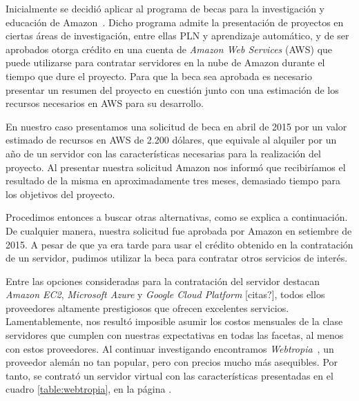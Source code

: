 Inicialmente se decidió aplicar al programa de becas para la investigación y educación de
Amazon~\cite{AmazonGrants}. Dicho programa admite la presentación de proyectos en ciertas áreas de
investigación, entre ellas PLN y aprendizaje automático, y de ser aprobados otorga crédito en una cuenta
de \textit{Amazon Web Services} (AWS) que puede utilizarse para contratar servidores en la nube de Amazon
durante el tiempo que dure el proyecto. Para que la beca sea aprobada es necesario presentar un resumen
del proyecto en cuestión junto con una estimación de los recursos necesarios en AWS para su desarrollo.

En nuestro caso presentamos una solicitud de beca en abril de 2015 por un valor estimado de recursos en
AWS de 2.200 dólares, que equivale al alquiler por un año de un servidor con las características
necesarias para la realización del proyecto. Al presentar nuestra solicitud Amazon nos informó que
recibiríamos el resultado de la misma en aproximadamente tres meses, demasiado tiempo para los objetivos
del proyecto.

Procedimos entonces a buscar otras alternativas, como se explica a continuación. De cualquier manera,
nuestra solicitud fue aprobada por Amazon en setiembre de 2015. A pesar de que ya era tarde para usar el
crédito obtenido en la contratación de un servidor, pudimos utilizar la beca para contratar otros
servicios de interés.

Entre las opciones consideradas para la contratación del servidor destacan \textit{Amazon EC2},
\textit{Microsoft Azure} y \textit{Google Cloud Platform} [citas?], todos ellos proveedores altamente
prestigiosos que ofrecen excelentes servicios. Lamentablemente, nos resultó imposible asumir los costos
mensuales de la clase servidores que cumplen con nuestras expectativas en todas las facetas, al menos
con estos proveedores. Al continuar investigando encontramos \textit{Webtropia}~\cite{Webtropia}, un
proveedor alemán no tan popular, pero con precios mucho más asequibles. Por tanto, se contrató un servidor
virtual con las características presentadas en el cuadro \ref{table:webtropia}, en la página
\pageref{table:webtropia}.


